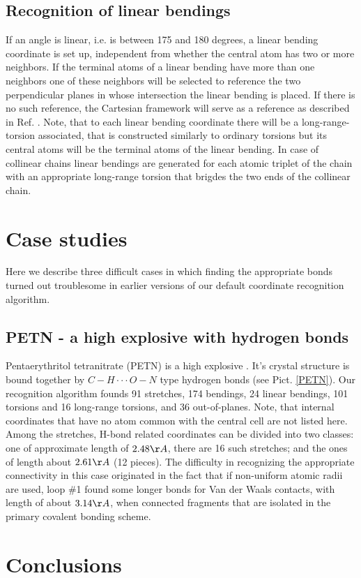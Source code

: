 \documentclass[prl,aps,preprint,superbib,12pt]{revtex4}
\begin{document}
\subsection{Recognition of linear bendings} 
If an angle is linear, i.e. is between 175 and 180 degrees, 
a linear bending coordinate is set up,
independent from whether the central atom has two or more neighbors.
If the terminal atoms of a linear bending have more than one
neighbors one of these neighbors will be selected to reference
the two perpendicular planes in whose intersection the linear bending is
placed. If there is no such reference, the Cartesian framework will
serve as a reference as described in Ref. .
Note, that to each linear bending coordinate there will be
a long-range-torsion associated, that is constructed similarly to
ordinary torsions but its central atoms will be the terminal atoms
of the linear bending.
In case of collinear chains linear bendings are generated for each 
atomic triplet of the chain with an appropriate long-range torsion
that brigdes the two ends of the collinear chain.

\section{Case studies}
Here we describe three difficult cases in which finding the 
appropriate bonds turned out troublesome in earlier versions
of our default coordinate recognition algorithm.

\subsection{PETN - a high explosive with hydrogen bonds}
Pentaerythritol tetranitrate (PETN) is a high explosive 
\cite{Conant_1979}. It's crystal structure is bound together
by $C-H \cdot\cdot\cdot O-N$ type hydrogen bonds (see Pict. \ref{PETN}).
Our recognition algorithm founds 91 stretches, 174 bendings,
24 linear bendings, 101 torsions and 16 long-range torsions, 
and 36 out-of-planes. Note, that internal coordinates
that have no atom common with the central cell are not listed here.
Among the stretches, H-bond related coordinates can be divided into 
two classes: one of approximate length of $2.48\AA$, there are
16 such stretches; and the ones of length about $2.61\AA$ (12 pieces).
The difficulty in recognizing the appropriate connectivity in this case
originated in the fact that if non-uniform atomic radii are used,
loop \#1 found some longer bonds for Van der Waals contacts, with 
length of about $3.14\AA$, when connected fragments that are 
isolated in the primary covalent bonding scheme.

\section{Conclusions} \label{Conclusions}


\end{document}
